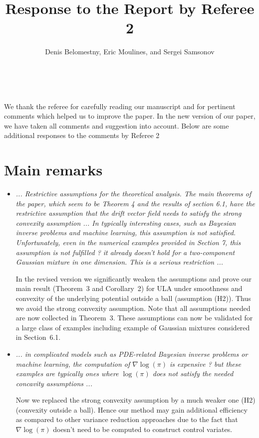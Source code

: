 \documentclass{article}%
\begin{document}
\title{\textbf{Response to the Report by Referee 2}}
\author{{\normalsize \vspace{-1cm} Denis Belomestny, Eric Moulines, and Sergei Samsonov}}
\date{~ }
\maketitle

\vspace{-0.5cm}

We thank the referee for carefully reading our manuscript and for pertinent
comments which helped us to improve the paper. In the new version of our
paper, we have taken all comments and suggestion into account.  Below are some additional responses to the
comments by Referee 2

\section*{Main remarks}

\begin{itemize}

\item \textit{... Restrictive assumptions for the theoretical analysis. The main theorems of the paper, which seem to be Theorem 4 and the results of section 6.1, have the restrictive assumption that the drift vector field  needs to satisfy the strong convexity assumption ... In typically interesting cases, such as Bayesian inverse problems and machine learning, this assumption is not satisfied. Unfortunately, even in the numerical examples provided in Section 7, this assumption is not fulfilled ? it already doesn't hold for a two-component Gaussian mixture in one dimension. This is a serious restriction ... }
\par
In the revised version we significantly weaken  the assumptions and prove our main result (Theorem~3 and Corollary~2) for ULA under smoothness  and convexity of the underlying potential outside a ball (assumption  (H2)).  Thus we avoid the strong convexity assumption.  Note that all assumptions needed are now collected in Theorem~3. These  assumptions can now be validated for a large class of examples including example of Gaussian mixtures considered in Section~6.1.
\item \textit{... in complicated models such as PDE-related Bayesian inverse problems or machine learning, the computation of \(\nabla \log(\pi)\) is expensive ? but these examples are typically ones where \(\log(\pi)\) does not satisfy the needed concavity assumptions ...}
\par
Now we replaced the strong convexity assumption by a much weaker one (H2) (convexity outside a ball). Hence our method may gain additional efficiency as compared to other variance reduction approaches due to the fact that \(\nabla \log(\pi)\) doesn't need to be computed to construct control variates.
\end{itemize}
\end{document}
